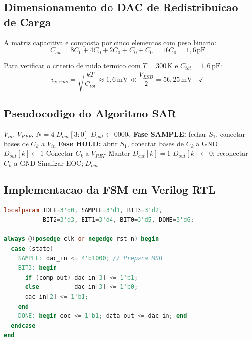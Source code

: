 \documentclass[12pt, a4paper]{article}
\begin{document}
\subsection{Dimensionamento do DAC de Redistribuicao de Carga}

A matriz capacitiva e composta por cinco elementos com peso binario:
\begin{equation}
  C_{tot} = 8C_0 + 4C_0 + 2C_0 + C_0 + C_0 = 16C_0 = 1{,}6\,\text{pF}
\end{equation}

Para verificar o criterio de ruido termico com $T = 300\,\text{K}$ e $C_{tot} = 1{,}6\,\text{pF}$:
\begin{equation}
  v_{n,rms} = \sqrt{\frac{kT}{C_{tot}}} \approx 1{,}6\,\text{mV} \ll \frac{V_{LSB}}{2} = 56{,}25\,\text{mV} \quad \checkmark
\end{equation}

\subsection{Pseudocodigo do Algoritmo SAR}

\begin{algorithm}[h!]
\caption{Algoritmo SAR de 4-bits}
\label{alg:sar}
\begin{algorithmic}[1]
\Require $V_{in}$, $V_{REF}$, $N = 4$
\Ensure $D_{out}[3:0]$
\State $D_{out} \leftarrow 0000_2$
\State \textbf{Fase SAMPLE:} fechar $S_1$, conectar bases de $C_k$ a $V_{in}$
\State \textbf{Fase HOLD:} abrir $S_1$, conectar bases de $C_k$ a GND
    \State $D_{out}[k] \leftarrow 1$
    \State Conectar $C_k$ a $V_{REF}$
        \State Manter $D_{out}[k] = 1$
    \Else
        \State $D_{out}[k] \leftarrow 0$; reconectar $C_k$ a GND
    \EndIf
\EndFor
\State Sinalizar EOC; \Return $D_{out}$
\end{algorithmic}
\end{algorithm}

\subsection{Implementacao da FSM em Verilog RTL}

\begin{lstlisting}[language=Verilog, caption={Extrato de \texttt{sar\_fsm\_4bit.v} -- estados e logica do DAC.}]
localparam IDLE=3'd0, SAMPLE=3'd1, BIT3=3'd2,
           BIT2=3'd3, BIT1=3'd4, BIT0=3'd5, DONE=3'd6;

always @(posedge clk or negedge rst_n) begin
  case (state)
    SAMPLE: dac_in <= 4'b1000; // Prepara MSB
    BIT3: begin
      if (comp_out) dac_in[3] <= 1'b1;
      else          dac_in[3] <= 1'b0;
      dac_in[2] <= 1'b1;
    end
    DONE: begin eoc <= 1'b1; data_out <= dac_in; end
  endcase
end
\end{lstlisting}
\end{document}
